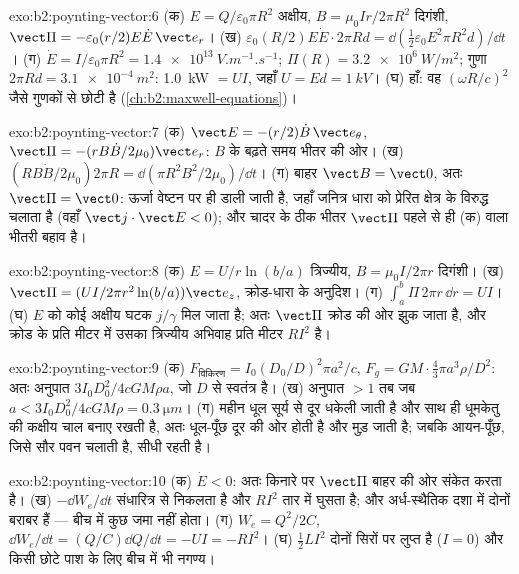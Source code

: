 \begin{solution}{exo:b2:poynting-vector:6}
(क) $E = Q/\varepsilon_0\pi R^2$ अक्षीय, $B = \mu_0Ir/2\pi R^2$ दिगंशी, $\vect\Pi = -\varepsilon_0
(r/2)E\dot E\,\vect e_r$। (ख) $\varepsilon_0(R/2)E\dot E\cdot2\pi Rd = \dd(\tfrac12\varepsilon_0E^2\pi R^2d)/
\dd t$। (ग) $\dot E = I/\varepsilon_0\pi R^2 = \qty{1.4e13}{V.m^{-1}.s^{-1}}$; $\Pi(R) = \qty{3.2e6}{W/m^2}$;
गुणा $2\pi Rd = \qty{3.1e-4}{m^2}$: \qty{1.0}{kW} $= UI$, जहाँ $U = Ed = \qty{1}{kV}$। (घ)
हाँ: वह $(\omega R/c)^2$ जैसे गुणकों से छोटी है (\cref{ch:b2:maxwell-equations})।
\end{solution}

\begin{solution}{exo:b2:poynting-vector:7}
(क) $\vect E = -(r/2)\dot B\,\vect e_\theta$, $\vect\Pi = -(rB\dot B/2\mu_0)\vect e_r$: $B$ के
बढ़ते समय भीतर की ओर। (ख) $(RB\dot B/2\mu_0)2\pi R = \dd(\pi R^2B^2/2\mu_0)/\dd t$। (ग)
बाहर $\vect B = \vect 0$, अतः $\vect\Pi = \vect 0$: ऊर्जा वेष्टन पर ही डाली जाती
है, जहाँ जनित्र धारा को प्रेरित क्षेत्र के विरुद्ध चलाता है
(वहाँ $\vect j\cdot\vect E < 0$); और चादर के ठीक भीतर
$\vect\Pi$ पहले से ही (क) वाला भीतरी बहाव है।
\end{solution}

\begin{solution}{exo:b2:poynting-vector:8}
(क) $E = U/r\ln(b/a)$ त्रिज्यीय, $B = \mu_0I/2\pi r$ दिगंशी। (ख) $\vect\Pi = (UI/
2\pi r^2\ln(b/a))\vect e_z$, क्रोड-धारा के अनुदिश। (ग) $\int_a^b\Pi\,2\pi r\,\dd r =
UI$। (घ) $E$ को कोई अक्षीय घटक $j/\gamma$ मिल जाता है; अतः $\vect\Pi$ क्रोड की
ओर झुक जाता है, और क्रोड के प्रति मीटर में उसका त्रिज्यीय अभिवाह प्रति मीटर $RI^2$ है।
\end{solution}

\begin{solution}{exo:b2:poynting-vector:9}
(क) $F_{\text{विकिरण}} = I_0(D_0/D)^2\pi a^2/c$, $F_g = GM\cdot\tfrac43\pi a^3\rho/D^2$: अतः अनुपात
$3I_0D_0^2/4cGM\rho a$, जो $D$ से स्वतंत्र है। (ख) अनुपात $> 1$ तब जब $a < 3I_0D_0^2/
4cGM\rho = \qty{0.3}{\micro m}$। (ग) महीन धूल सूर्य से दूर धकेली जाती है और साथ ही
धूमकेतु की कक्षीय चाल बनाए रखती है, अतः धूल-पूँछ दूर की ओर होती है और
मुड़ जाती है; जबकि आयन-पूँछ, जिसे सौर पवन चलाती है, सीधी रहती है।
\end{solution}

\begin{solution}{exo:b2:poynting-vector:10}
(क) $\dot E < 0$: अतः किनारे पर $\vect\Pi$ बाहर की ओर संकेत करता है। (ख) $-\dd W_e/\dd t$
संधारित्र से निकलता है और $RI^2$ तार में घुसता है; और अर्ध-स्थैतिक
दशा में दोनों बराबर हैं --- बीच में कुछ जमा नहीं होता। (ग) $W_e =
Q^2/2C$, $\dd W_e/\dd t = (Q/C)\dd Q/\dd t = -UI = -RI^2$। (घ) $\tfrac12LI^2$
दोनों सिरों पर लुप्त है ($I = 0$) और किसी छोटे पाश के लिए बीच में भी
नगण्य।
\end{solution}

